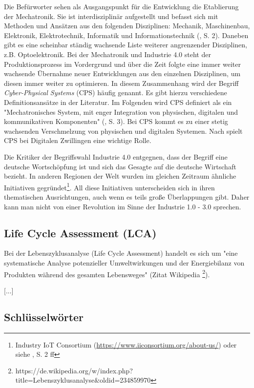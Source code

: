 \documentclass{article}
\begin{document}
Die Befürworter sehen als Ausgangspunkt für die Entwicklung die Etablierung der Mechatronik. Sie ist interdisziplinär aufgestellt und befasst sich mit Methoden und Ansätzen aus den folgenden Disziplinen: Mechanik, Maschinenbau, Elektronik, Elektrotechnik, Informatik und Informationstechnik (\cite{ragavan2016engineering}, S. 2). Daneben gibt es eine scheinbar ständig wachsende Liste weiterer angrenzender Disziplinen, z.B. Optoelektronik. Bei der Mechatronik und Industrie 4.0 steht der Produktionsprozess im Vordergrund und über die Zeit folgte eine immer weiter wachsende Übernahme neuer Entwicklungen aus den einzelnen Disziplinen, um diesen immer weiter zu optimieren. In diesem Zusammenhang wird der Begriff \textit{Cyber-Physical Systems} (CPS) häufig genannt. Es gibt hierzu verschiedene Definitionsansätze in der Literatur. Im Folgenden wird CPS definiert als ein "Mechatronisches System, mit enger Integration von physischen, digitalen und kommunikativen Komponenten" (\cite{ragavan2016engineering}, S. 3). Bei CPS kommt es zu einer stetig wachsenden Verschmelzung von physischen und digitalen Systemen. Nach \cite{klein2019architektur} spielt CPS bei Digitalen Zwillingen eine wichtige Rolle.

Die Kritiker der Begriffswahl Industrie 4.0 entgegnen, dass der Begriff eine deutsche Wortschöpfung ist und sich das Gesagte auf die deutsche Wirtschaft bezieht. In anderen Regionen der Welt wurden im gleichen Zeitraum ähnliche Initiativen gegründet\footnote{Industry IoT Consortium (\url{https://www.iiconsortium.org/about-us/}) oder siehe \cite{trotta2018industry}, S. 2 ff}. All diese Initiativen unterscheiden sich in ihren thematischen Ausrichtungen, auch wenn es teils große Überlappungen gibt. Daher kann man nicht von einer Revolution im Sinne der Industrie 1.0 - 3.0 sprechen.

\subsection{Life Cycle Assessment (LCA)}

Bei der Lebenszyklusanalyse (Life Cycle Assessment) handelt es sich um "eine systematische Analyse potenzieller Umweltwirkungen und der Energiebilanz von Produkten während des gesamten Lebensweges" (Zitat Wikipedia \footnote{https://de.wikipedia.org/w/index.php?title=Lebenszyklusanalyse\&oldid=234859970}).

[...]

\subsection{Schlüsselwörter}
\end{document}
